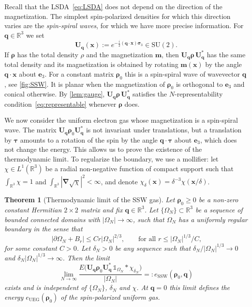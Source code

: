 \documentclass[final,reqno]{amsart}
\newtheorem{theorem}{Theorem}[section]
\theoremstyle{remark}
\renewcommand{\le}{\leqslant}
\renewcommand{\ge}{\geqslant}
\newcommand{\RR}{\mathbb{R}}
\newcommand{\SU}{\mathrm{SU}}
\newcommand{\UEG}{\mathrm{UEG}}
\newcommand{\SSW}{\mathrm{SSW}}
\newcommand{\iden}{\mathbb{1}}
\newcommand{\grad}{\bm{\nabla}}
\begin{document}
Recall that the LSDA~\cref{eq:LSDA} does not depend on the direction of the magnetization. The simplest spin-polarized densities for which this direction varies are the \emph{spin-spiral waves}, for which we have more precise information. For $\mathbf{q}\in\RR^3$ we set
\begin{equation}\label{eq:def_U_q}
\mathbf{U}_{\mathbf{q}}(\mathbf{x}):=e^{-\frac{i}2(\mathbf{q}\cdot\mathbf{x})\bm{\sigma}_3}\in\SU(2).
\end{equation}
If $\bm{\rho}$ has the total density $\rho$ and the magnetization $\mathbf{m}$, then $\mathbf{U}_{\mathbf{q}}\bm{\rho}\,\mathbf{U}_{\mathbf{q}}^*$ has the same total density and its magnetization is obtained by rotating $\mathbf{m}(\mathbf{x})$ by the angle $\mathbf{q}\cdot\mathbf{x}$ about $\mathbf{e}_3$. For a constant matrix $\bm{\rho}_0$ this is a spin-spiral wave of wavevector $\mathbf{q}$, see \cref{fig:SSW}. It is planar when the magnetization of $\bm{\rho}_0$ is orthogonal to $\mathbf{e}_3$ and conical otherwise. By \cref{lem:gauge}, $\mathbf{U}_{\mathbf{q}}\bm{\rho}\,\mathbf{U}_{\mathbf{q}}^*$ satisfies the $N$-representability condition~\cref{eq:representable} whenever $\bm{\rho}$ does.

We now consider the uniform electron gas whose magnetization is a spin-spiral wave. The matrix $\mathbf{U}_{\mathbf{q}}\bm{\rho}_0\mathbf{U}_{\mathbf{q}}^*$ is not invariant under translations, but a translation by $\bm{\tau}$ amounts to a rotation of the spin by the angle $\mathbf{q}\cdot\bm{\tau}$ about $\mathbf{e}_3$, which does not change the energy. This allows us to prove the existence of the thermodynamic limit. To regularize the boundary, we use a mollifier: let $\chi\in L^1(\RR^3)$ be a radial non-negative function of compact support such that $\int_{\RR^3}\chi=1$ and $\int_{\RR^3}|\grad\sqrt\chi|^2<\infty$, and denote $\chi_\delta(\mathbf{x})=\delta^{-3}\chi(\mathbf{x}/\delta)$.

\begin{theorem}[Thermodynamic limit of the SSW gas]\label{thm:spiral_limit}
Let $\bm{\rho}_0\ge0$ be a non-zero constant Hermitian $2\times 2$ matrix and fix $\mathbf{q}\in\RR^3$. Let $\{\Omega_N\}\subset\RR^3$ be a sequence of bounded connected domains with $|\Omega_N|\to\infty$, such that $\Omega_N$ has a uniformly regular boundary in the sense that
$$
|\partial\Omega_N+B_r|\le Cr|\Omega_N|^{2/3},\qquad\text{for all $r\le |\Omega_N|^{1/3}/C$,}
$$
for some constant $C>0$. Let $\delta_N>0$ be any sequence such that $\delta_N/|\Omega_N|^{1/3}\to0$ and $\delta_N|\Omega_N|^{1/3}\to\infty$. Then the limit
\begin{equation}\label{eq:spiral_limit}
\boxed{\lim_{N\to\infty}\frac{E\big(\mathbf{U}_{\mathbf{q}}\bm{\rho}_0\mathbf{U}_{\mathbf{q}}^*\,\iden_{\Omega_N}\ast\chi_{\delta_N}\big)}{|\Omega_N|}=:e_\SSW(\bm{\rho}_0,\mathbf{q})}
\end{equation}
exists and is independent of $\{\Omega_N\}$, $\delta_N$ and $\chi$. At $\mathbf{q}=0$ this limit defines the energy $e_\UEG(\bm{\rho}_0)$ of the spin-polarized uniform gas.
\end{theorem}
\end{document}
